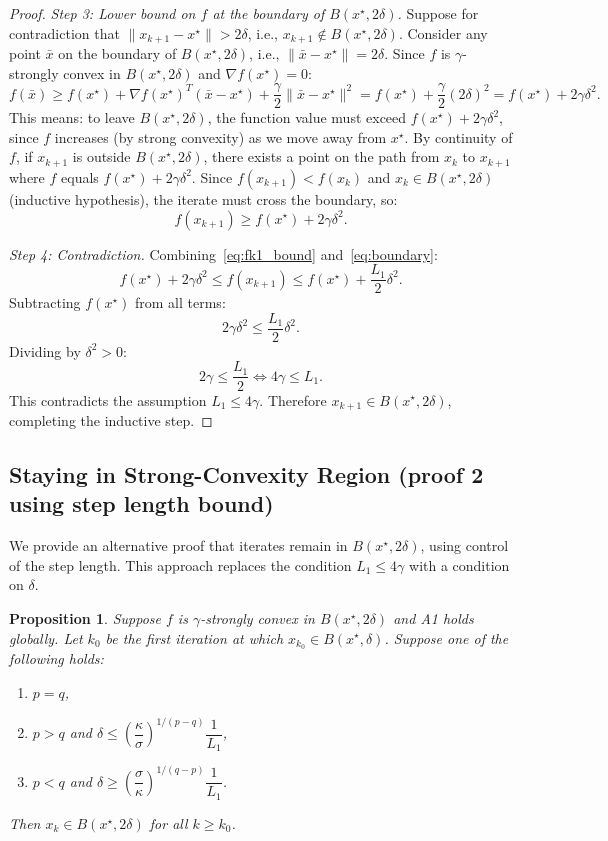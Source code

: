 \documentclass{article}
\newtheorem{proposition}{Proposition}
\begin{document}
\begin{proof}
\medskip
\emph{Step 3: Lower bound on $f$ at the boundary of $B(x^\star, 2\delta)$.} Suppose for contradiction that $\|x_{k+1} - x^\star\| > 2\delta$, i.e., $x_{k+1} \notin B(x^\star, 2\delta)$. Consider any point $\bar{x}$ on the boundary of $B(x^\star, 2\delta)$, i.e., $\|\bar{x} - x^\star\| = 2\delta$. Since $f$ is $\gamma$-strongly convex in $B(x^\star, 2\delta)$ and $\nabla f(x^\star) = 0$:
\[
f(\bar{x}) \geq f(x^\star) + \nabla f(x^\star)^T(\bar{x} - x^\star) + \frac{\gamma}{2}\|\bar{x} - x^\star\|^2 = f(x^\star) + \frac{\gamma}{2}(2\delta)^2 = f(x^\star) + 2\gamma\delta^2.
\]
This means: to leave $B(x^\star, 2\delta)$, the function value must exceed $f(x^\star) + 2\gamma\delta^2$, since $f$ increases (by strong convexity) as we move away from $x^\star$. By continuity of $f$, if $x_{k+1}$ is outside $B(x^\star, 2\delta)$, there exists a point on the path from $x_k$ to $x_{k+1}$ where $f$ equals $f(x^\star) + 2\gamma\delta^2$. Since $f(x_{k+1}) < f(x_k)$ and $x_k \in B(x^\star, 2\delta)$ (inductive hypothesis), the iterate must cross the boundary, so:
\begin{equation}
\label{eq:boundary}
f(x_{k+1}) \geq f(x^\star) + 2\gamma\delta^2.
\end{equation}

\medskip
\emph{Step 4: Contradiction.} Combining~\eqref{eq:fk1_bound} and~\eqref{eq:boundary}:
\[
f(x^\star) + 2\gamma\delta^2 \leq f(x_{k+1}) \leq f(x^\star) + \frac{L_1}{2}\delta^2.
\]
Subtracting $f(x^\star)$ from all terms:
\[
2\gamma\delta^2 \leq \frac{L_1}{2}\delta^2.
\]
Dividing by $\delta^2 > 0$:
\[
2\gamma \leq \frac{L_1}{2} \iff 4\gamma \leq L_1.
\]
This contradicts the assumption $L_1 \leq 4\gamma$. Therefore $x_{k+1} \in B(x^\star, 2\delta)$, completing the inductive step.

\end{proof}


\subsection{Staying in Strong-Convexity Region (proof 2 using step length bound)}

We provide an alternative proof that iterates remain in $B(x^\star, 2\delta)$, using control of the step length. 
This approach replaces the condition $L_1 \leq 4\gamma$ with a condition on $\delta$.

\begin{proposition}
\label{prop:stay_step}
Suppose $f$ is $\gamma$-strongly convex in $B(x^\star, 2\delta)$ and A1 holds globally. Let $k_0$ be the first iteration at which $x_{k_0} \in B(x^\star, \delta)$. Suppose one of the following holds:
\begin{enumerate}
    \item $p = q$,
    \item $p > q$ and $\delta \leq \left(\dfrac{\kappa}{\sigma}\right)^{1/(p-q)}\dfrac{1}{L_1}$,
    \item $p < q$ and $\delta \geq \left(\dfrac{\sigma}{\kappa}\right)^{1/(q-p)}\dfrac{1}{L_1}$.
\end{enumerate}
Then $x_k \in B(x^\star, 2\delta)$ for all $k \geq k_0$.
\end{proposition}
\end{document}
